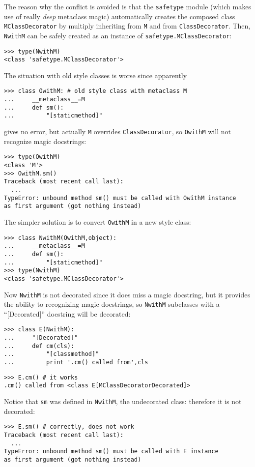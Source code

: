 \documentclass[11pt,english]{article}
\begin{document}
The reason why the conflict is avoided is that the \texttt{safetype} module
(which makes use of really \emph{deep} metaclass magic) automatically
creates the composed class \texttt{MClassDecorator} by multiply inheriting
from \texttt{M} and from \texttt{ClassDecorator}. Then, \texttt{NwithM} can be safely 
created as an instance of \texttt{safetype.MClassDecorator}:
\begin{verbatim}>>> type(NwithM)
<class 'safetype.MClassDecorator'>\end{verbatim}

The situation with old style classes is worse since
apparently
\begin{verbatim}>>> class OwithM: # old style class with metaclass M
...     __metaclass__=M
...     def sm(): 
...         "[staticmethod]"\end{verbatim}

gives no error, but actually \texttt{M} overrides 
\texttt{ClassDecorator}, so \texttt{OwithM} will not recognize magic docstrings:
\begin{verbatim}>>> type(OwithM)
<class 'M'>
>>> OwithM.sm()
Traceback (most recent call last):
  ...
TypeError: unbound method sm() must be called with OwithM instance 
as first argument (got nothing instead)\end{verbatim}

The simpler solution is to convert \texttt{OwithM} in a new style class:
\begin{verbatim}>>> class NwithM(OwithM,object):
...     __metaclass__=M
...     def sm():
...         "[staticmethod]"
>>> type(NwithM) 
<class 'safetype.MClassDecorator'>\end{verbatim}

Now \texttt{NwithM} is not decorated since it does miss a magic docstring, but
it provides the ability to recognizing magic docstrings, so \texttt{NwithM}
subclasses with a ``[Decorated]'' docstring will be decorated:
\begin{verbatim}>>> class E(NwithM): 
...     "[Decorated]"
...     def cm(cls):
...         "[classmethod]"
...         print '.cm() called from',cls\end{verbatim}
\begin{verbatim}>>> E.cm() # it works
.cm() called from <class E[MClassDecoratorDecorated]>\end{verbatim}

Notice that \texttt{sm} was defined in \texttt{NwithM}, the undecorated class: therefore
it is not decorated:
\begin{verbatim}>>> E.sm() # correctly, does not work
Traceback (most recent call last):
  ...
TypeError: unbound method sm() must be called with E instance 
as first argument (got nothing instead)\end{verbatim}
\end{document}
